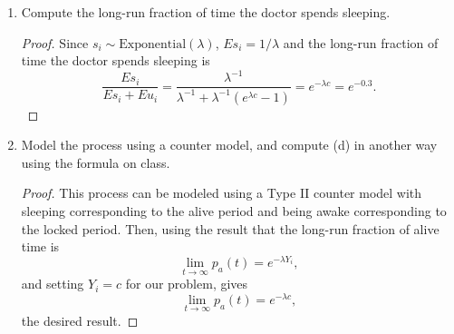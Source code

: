 \documentclass[oneside]{amsart}
\newcommand{\Exp}{\mathrm{Exponential}}
\theoremstyle{definition}
\begin{document}
\begin{enumerate}[label=(\alph*)]
\begin{proof}
We have 
\[
	E u_i = \frac{e^{\lambda c} -1}{\lambda} 
	=\frac{e^{0.5 \cdot 0.6} -1}{0.6} 
	= 2(e^{0.3} - 1).
\]
\end{proof}
\item
Compute the long-run fraction of time the doctor spends sleeping.
\begin{proof}
Since $s_i \sim \Exp(\lambda)$, $E s_i = 1 / \lambda$ and the long-run fraction of time the doctor spends sleeping is 
\[
	\frac{E s_i }{E s_i + E u_i} = \frac{\lambda^{-1}}{\lambda^{-1} + \lambda^{-1} (e^{\lambda c} - 1)}
	= e^{-\lambda c} 
	= e^{-0.3}.
\]
\end{proof}
\item
Model the process using a counter model, and compute (d) in another way using the formula on class.
\begin{proof}
This process can be modeled using a Type II counter model with sleeping corresponding to the alive period and being awake corresponding to the locked period. Then, using the result that the long-run fraction of alive time is 
\[
	\lim_{t\to \infty} p_a(t) = e^{-\lambda Y_i},
\]
and setting $Y_i = c$ for our problem, gives
\[
	\lim_{t\to \infty} p_a(t) = e^{-\lambda c},
\]
the desired result.
\end{proof}
\end{enumerate}
\end{document}

